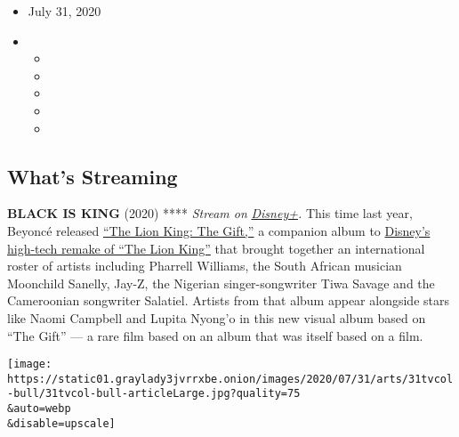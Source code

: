 \begin{itemize}
\item
  July 31, 2020
\item
  \begin{itemize}
  \item
  \item
  \item
  \item
  \item
  \end{itemize}
\end{itemize}

\hypertarget{whats-streaming}{%
\subsection{What's Streaming}\label{whats-streaming}}

\textbf{BLACK IS KING} (2020) **** \emph{Stream on}
\href{https://www.disneyplus.com/home}{\emph{Disney+}}\emph{.} This time
last year, Beyoncé released
\href{https://www.nytimes3xbfgragh.onion/2019/07/24/arts/music/beyonce-the-lion-king-the-gift-review.html}{``The
Lion King: The Gift,''} a companion album to
\href{https://www.nytimes3xbfgragh.onion/2019/07/11/movies/the-lion-king-review.html}{Disney's
high-tech remake of ``The Lion King''} that brought together an
international roster of artists including Pharrell Williams, the South
African musician Moonchild Sanelly, Jay-Z, the Nigerian
singer-songwriter Tiwa Savage and the Cameroonian songwriter Salatiel.
Artists from that album appear alongside stars like Naomi Campbell and
Lupita Nyong'o in this new visual album based on ``The Gift'' --- a rare
film based on an album that was itself based on a film.

\texttt{[image: https://static01.graylady3jvrrxbe.onion/images/2020/07/31/arts/31tvcol-bull/31tvcol-bull-articleLarge.jpg?quality=75\\\&auto=webp\\\&disable=upscale]}

